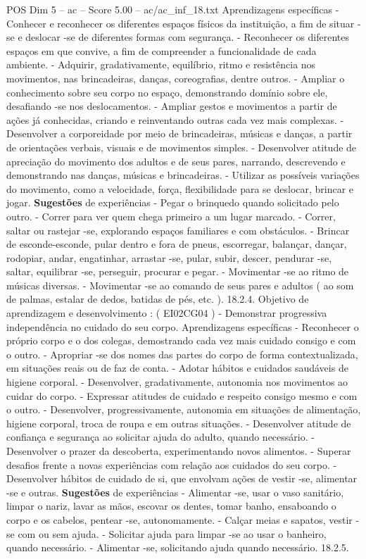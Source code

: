 \begin{textsample}{POS Dim 5 – ac – Score 5.00 – ac/ac\_inf\_18.txt}
Aprendizagens específicas - Conhecer e reconhecer os diferentes espaços físicos da instituição, a fim de situar -se e deslocar -se de diferentes formas com segurança. - Reconhecer os diferentes espaços em que convive, a fim de compreender a funcionalidade de cada ambiente. - Adquirir, gradativamente, equilíbrio, ritmo e resistência nos movimentos, nas brincadeiras, danças, coreografias, dentre outros. - Ampliar o conhecimento sobre seu corpo no espaço, demonstrando domínio sobre ele, desafiando -se nos deslocamentos. - Ampliar gestos e movimentos a partir de ações já conhecidas, criando e reinventando outras cada vez mais complexas. - Desenvolver a corporeidade por meio de brincadeiras, músicas e danças, a partir de orientações verbais, visuais e de movimentos simples. - Desenvolver atitude de apreciação do movimento dos adultos e de seus pares, narrando, descrevendo e demonstrando nas danças, músicas e brincadeiras. - Utilizar as possíveis variações do movimento, como a velocidade, força, flexibilidade para se deslocar, brincar e jogar. \textbf{Sugestões} de experiências - Pegar o brinquedo quando solicitado pelo outro. - Correr para ver quem chega primeiro a um lugar marcado. - Correr, saltar ou rastejar -se, explorando espaços familiares e com obstáculos. - Brincar de esconde-esconde, pular dentro e fora de pneus, escorregar, balançar, dançar, rodopiar, andar, engatinhar, arrastar -se, pular, subir, descer, pendurar -se, saltar, equilibrar -se, perseguir, procurar e pegar. - Movimentar -se ao ritmo de músicas diversas. - Movimentar -se ao comando de seus pares e adultos ( ao som de palmas, estalar de dedos, batidas de pés, etc. ). 18.2.4.
Objetivo de aprendizagem e desenvolvimento : ( EI02CG04 ) - Demonstrar progressiva independência no cuidado do seu corpo.
Aprendizagens específicas - Reconhecer o próprio corpo e o dos colegas, demostrando cada vez mais cuidado consigo e com o outro. - Apropriar -se dos nomes das partes do corpo de forma contextualizada, em situações reais ou de faz de conta. - Adotar hábitos e cuidados saudáveis de higiene corporal. - Desenvolver, gradativamente, autonomia nos movimentos ao cuidar do corpo. - Expressar atitudes de cuidado e respeito consigo mesmo e com o outro. - Desenvolver, progressivamente, autonomia em situações de alimentação, higiene corporal, troca de roupa e em outras situações. - Desenvolver atitude de confiança e segurança ao solicitar ajuda do adulto, quando necessário. - Desenvolver o prazer da descoberta, experimentando novos alimentos. - Superar desafios frente a novas experiências com relação aos cuidados do seu corpo. - Desenvolver hábitos de cuidado de si, que envolvam ações de vestir -se, alimentar -se e outras. \textbf{Sugestões} de experiências - Alimentar -se, usar o vaso sanitário, limpar o nariz, lavar as mãos, escovar os dentes, tomar banho, ensaboando o corpo e os cabelos, pentear -se, autonomamente. - Calçar meias e sapatos, vestir -se com ou sem ajuda. - Solicitar ajuda para limpar -se ao usar o banheiro, quando necessário. - Alimentar -se, solicitando ajuda quando necessário. 18.2.5.

\end{textsample}
